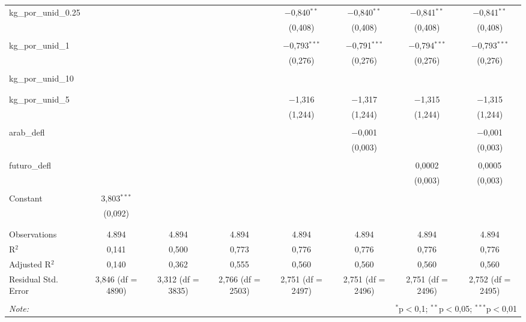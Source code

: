 \begin{table}[!htbp]
\begin{tabular}{@{\extracolsep{5pt}}lccccccc}
 kg\_por\_unid\_0.25 &  &  &  & $-$0,840$^{**}$ & $-$0,840$^{**}$ & $-$0,841$^{**}$ & $-$0,841$^{**}$ \\ 
  &  &  &  & (0,408) & (0,408) & (0,408) & (0,408) \\ 
  & & & & & & & \\ 
 kg\_por\_unid\_1 &  &  &  & $-$0,793$^{***}$ & $-$0,791$^{***}$ & $-$0,794$^{***}$ & $-$0,793$^{***}$ \\ 
  &  &  &  & (0,276) & (0,276) & (0,276) & (0,276) \\ 
  & & & & & & & \\ 
 kg\_por\_unid\_10 &  &  &  &  &  &  &  \\ 
  &  &  &  &  &  &  &  \\ 
  & & & & & & & \\ 
 kg\_por\_unid\_5 &  &  &  & $-$1,316 & $-$1,317 & $-$1,315 & $-$1,315 \\ 
  &  &  &  & (1,244) & (1,244) & (1,244) & (1,244) \\ 
  & & & & & & & \\ 
 arab\_defl &  &  &  &  & $-$0,001 &  & $-$0,001 \\ 
  &  &  &  &  & (0,003) &  & (0,003) \\ 
  & & & & & & & \\ 
 futuro\_defl &  &  &  &  &  & 0,0002 & 0,0005 \\ 
  &  &  &  &  &  & (0,003) & (0,003) \\ 
  & & & & & & & \\ 
 Constant & 3,803$^{***}$ &  &  &  &  &  &  \\ 
  & (0,092) &  &  &  &  &  &  \\ 
  & & & & & & & \\ 
\hline \\[-1.8ex] 
Observations & 4.894 & 4.894 & 4.894 & 4.894 & 4.894 & 4.894 & 4.894 \\ 
R$^{2}$ & 0,141 & 0,500 & 0,773 & 0,776 & 0,776 & 0,776 & 0,776 \\ 
Adjusted R$^{2}$ & 0,140 & 0,362 & 0,555 & 0,560 & 0,560 & 0,560 & 0,560 \\ 
Residual Std. Error & 3,846 (df = 4890) & 3,312 (df = 3835) & 2,766 (df = 2503) & 2,751 (df = 2497) & 2,751 (df = 2496) & 2,751 (df = 2496) & 2,752 (df = 2495) \\ 
\hline 
\hline \\[-1.8ex] 
\textit{Note:}  & \multicolumn{7}{r}{$^{*}$p$<$0,1; $^{**}$p$<$0,05; $^{***}$p$<$0,01} \\ 
\end{tabular} 
\end{table} 
